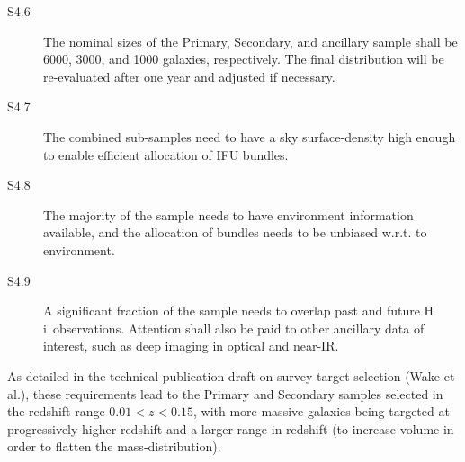 \documentclass[preprint,11pt]{aastex}
\newcommand{\Reff}{{R$_{e}$}}
\newcommand{\HI}{{\sc H\,i}}
\begin{document}
\begin{description}
\item [S4.6] The nominal sizes of the Primary, Secondary, and ancillary sample
  shall be 6000, 3000, and 1000 galaxies, respectively. The final
  distribution will be re-evaluated after one year and adjusted if necessary. 
\item [S4.7] The combined sub-samples need to have a sky surface-density high
  enough to enable efficient allocation of IFU bundles.
\item [S4.8] The majority of the sample needs to have environment
  information available, and the allocation of bundles needs to be
  unbiased w.r.t. to environment.
\item [S4.9] A significant fraction of the sample needs to overlap
  past and future \HI\ observations. Attention shall also be paid to
  other ancillary data of interest, such as deep imaging in optical
  and near-IR.
\end{description}

As detailed in the technical publication draft on survey target selection (Wake et al.), 
these requirements lead to the Primary and
Secondary samples selected in the redshift range $0.01 < z < 0.15$,
with more massive galaxies being targeted at progressively higher
redshift and a larger range in redshift (to increase volume in order
to flatten the mass-distribution).%


\end{document}
